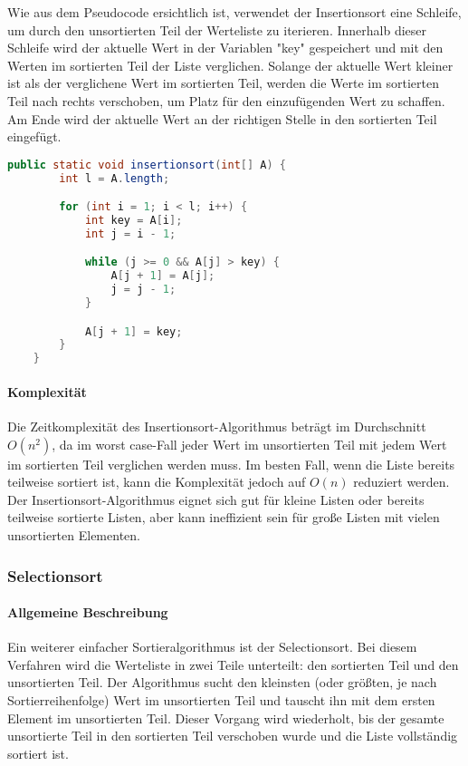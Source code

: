 \documentclass{article}
\begin{document}
	Wie aus dem Pseudocode ersichtlich ist, verwendet der Insertionsort eine Schleife, um durch den unsortierten Teil der Werteliste zu iterieren. Innerhalb dieser Schleife wird der aktuelle Wert in der Variablen "key" gespeichert und mit den Werten im sortierten Teil der Liste verglichen. Solange der aktuelle Wert kleiner ist als der verglichene Wert im sortierten Teil, werden die Werte im sortierten Teil nach rechts verschoben, um Platz für den einzufügenden Wert zu schaffen. Am Ende wird der aktuelle Wert an der richtigen Stelle in den sortierten Teil eingefügt.


	\begin{lstlisting}[language=Java, caption=Der Insertionsort-Algorithmus in Java]
	public static void insertionsort(int[] A) {
		int l = A.length;

		for (int i = 1; i < l; i++) {
			int key = A[i];
			int j = i - 1;

			while (j >= 0 && A[j] > key) {
				A[j + 1] = A[j];
				j = j - 1;
			}

			A[j + 1] = key;
		}
	}
	\end{lstlisting}

	\paragraph{Komplexität}
	Die Zeitkomplexität des Insertionsort-Algorithmus beträgt im Durchschnitt \textbf{$O(n^2)$}, da im worst case-Fall jeder Wert im unsortierten Teil mit jedem Wert im sortierten Teil verglichen werden muss. Im besten Fall, wenn die Liste bereits teilweise sortiert ist, kann die Komplexität jedoch auf \textbf{$O(n)$} reduziert werden. Der Insertionsort-Algorithmus eignet sich gut für kleine Listen oder bereits teilweise sortierte Listen, aber kann ineffizient sein für große Listen mit vielen unsortierten Elementen.


	\subsubsection{Selectionsort}
	\paragraph{Allgemeine Beschreibung}
Ein weiterer einfacher Sortieralgorithmus ist der Selectionsort. Bei diesem Verfahren wird die Werteliste in zwei Teile unterteilt: den sortierten Teil und den unsortierten Teil. Der Algorithmus sucht den kleinsten (oder größten, je nach Sortierreihenfolge) Wert im unsortierten Teil und tauscht ihn mit dem ersten Element im unsortierten Teil. Dieser Vorgang wird wiederholt, bis der gesamte unsortierte Teil in den sortierten Teil verschoben wurde und die Liste vollständig sortiert ist.
\end{document}
